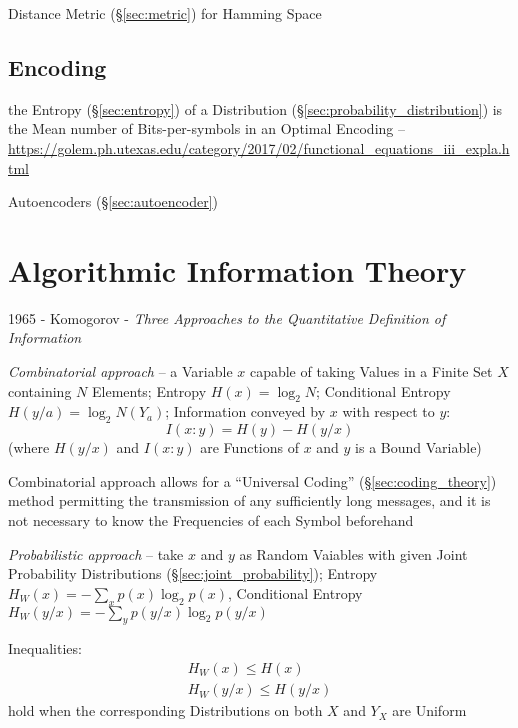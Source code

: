 Distance Metric (\S\ref{sec:metric}) for Hamming Space



\subsection{Encoding}\label{sec:encoding}

the Entropy (\S\ref{sec:entropy}) of a Distribution
(\S\ref{sec:probability_distribution}) is the Mean number of
Bits-per-symbols in an Optimal Encoding --
\url{https://golem.ph.utexas.edu/category/2017/02/functional_equations_iii_expla.html}

\fist Autoencoders (\S\ref{sec:autoencoder})



\section{Algorithmic Information Theory}\label{sec:algorithmic_information}

1965 - Komogorov - \emph{Three Approaches to the Quantitative Definition of
  Information}

\emph{Combinatorial approach} -- a Variable $x$ capable of taking Values in a
Finite Set $X$ containing $N$ Elements; Entropy $H(x) = \log_2 N$; Conditional
Entropy $H(y/a) = \log_2 N(Y_a)$; Information conveyed by $x$ with respect to
$y$:
\[
  I(x:y) = H(y) - H(y/x)
\]
(where $H(y/x)$ and $I(x : y)$ are Functions of $x$ and $y$ is a Bound Variable)

Combinatorial approach allows for a ``Universal Coding''
(\S\ref{sec:coding_theory}) method permitting the transmission of any
sufficiently long messages, and it is not necessary to know the Frequencies of
each Symbol beforehand

\emph{Probabilistic approach} -- take $x$ and $y$ as Random Vaiables with given
Joint Probability Distributions (\S\ref{sec:joint_probability}); Entropy
$H_W(x) = -\sum_x p(x) \log_2 p(x)$, Conditional Entropy
$H_W(y/x) = -\sum_y p(y/x) \log_2 p(y/x)$

Inequalities:
\begin{align*}
  H_W(x) \leq H(x) \\
  H_W(y/x) \leq H(y/x)
\end{align*}
hold when the corresponding Distributions on both $X$ and $Y_X$ are Uniform

